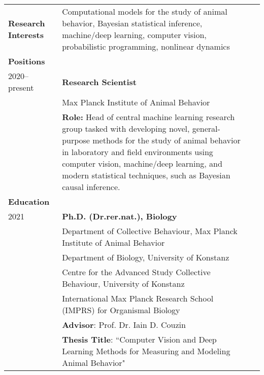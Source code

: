 \documentclass[letterpaper,10pt,oneside]{article}
\begin{document}
\begin{small}
\noindent \begin{longtable}{@{} l p{5.3in}l}

\large{\textbf{Research Interests}}
& Computational models for the study of animal behavior, Bayesian statistical inference, machine/deep learning, computer vision, probabilistic programming, nonlinear dynamics \vspace{2mm}\\ 

\Large{\textbf{Positions}} \vspace{5mm} \\
\large{2020--present} 
& \textbf{Research Scientist} \\
& {Max Planck Institute of Animal Behavior} \vspace{1mm}\\
& \textbf{Role:} Head of central machine learning research group tasked with developing novel, general-purpose methods for the study of animal behavior in laboratory and field environments using computer vision, machine/deep learning, and modern statistical techniques, such as Bayesian causal inference. \\

\Large{\textbf{Education}} \vspace{5mm} \\
 \large{2021} 
 & \textbf{Ph.D.  (Dr.rer.nat.), Biology} \\
 & {Department of Collective Behaviour, Max Planck Institute of Animal Behavior} \\
  & {Department of Biology, University of Konstanz} \\
    & {Centre for the Advanced Study Collective Behaviour, University of Konstanz} \\
 	& {International Max Planck Research School (IMPRS) for Organismal Biology} \vspace{1mm} \\
     &\textbf{Advisor}: Prof. Dr. Iain D. Couzin\\
     &\textbf{Thesis Title}: ``Computer Vision and Deep Learning Methods for Measuring and Modeling Animal Behavior"
     &  \vspace{5mm}\\
     

\end{longtable}
\end{small}
\end{document}

